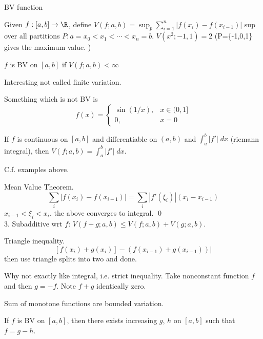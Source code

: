 BV function

Given $f: [a,b] \to \R$, define $V(f; a,b)=\sup_p \sum_{i=1}^n |f(x_i)-f(x_{i-1})|$ sup over all partitions $P:a=x_0<x_1<\cdots<x_n=b$. $V(x^2; -1,1)=2$ (P=\{-1,0,1\} gives the maximum value. ) 


\begin{dfn}
$f$ is BV on $[a,b]$ if $V(f; a,b)<\infty$
\end{dfn}

Interesting not called finite variation. 


Something which is not BV is 
	\[
	f(x)=
	\begin{cases}
	\sin(1/x), & x \in (0,1] \\
	0, & x=0
	\end{cases}
	\]



\begin{thm}
If $f$ is continuous on $[a,b]$ and differentiable on $(a,b)$ and $\int_a^b |f'| \; dx$ (riemann integral), then $V(f;a,b)= \int_a^b |f'| \; dx$.
\end{thm}

C.f. examples above. 


\pf Mean Value Theorem. 
	\[
	\sum_i |f(x_i) - f(x_{i-1})| = \sum_i |f'(\xi_i)| (x_i-x_{i-1})
	\]
$x_{i-1}< \xi_i < x_i$. the above converges to integral. \qed \\

3. Subadditive wrt $f$:
$V(f+g; a,b) \leq V(f; a,b) + V(g; a,b)$. 

\pf Triangle inequality.
	\[
	[f(x_i) + g(x_i)] - (f(x_{i-1}) + g(x_{i-1})) |
	\]
then use triangle splits into two and done. 

Why not exactly like integral, i.e. strict inequality. Take nonconstant function $f$ and then $g= -f$. Note $f+g$ identically zero. 




Sum of monotone functions are bounded variation. 



\begin{thm}[BV Decomposition]
If $f$ is BV on $[a,b]$, then there exists increasing $g$, $h$ on $[a,b]$ such that $f= g-h$. 
\end{thm}

